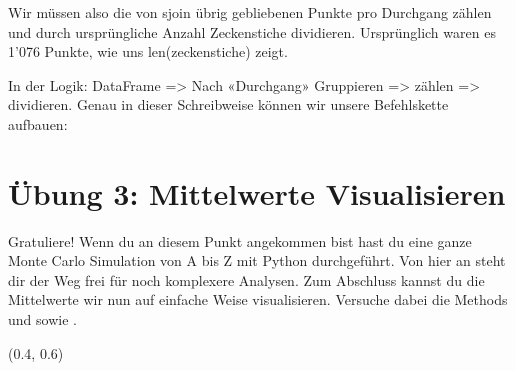 \documentclass[letterpaper,10pt,english]{sphinxmanual}
\begin{document}
Wir müssen also die von sjoin übrig gebliebenen Punkte pro Durchgang zählen und durch ursprüngliche Anzahl Zeckenstiche dividieren.  Ursprünglich waren es 1’076 Punkte, wie uns len(zeckenstiche) zeigt.

In der Logik: DataFrame =\textgreater{} Nach «Durchgang» Gruppieren =\textgreater{} zählen =\textgreater{} dividieren. Genau in dieser Schreibweise können wir unsere Befehlskette aufbauen:

\begin{sphinxVerbatim}[commandchars=\\\{\}]
  
\end{sphinxVerbatim}


\section{Übung 3: Mittelwerte Visualisieren}
\label{\detokenize{03_04_Waldanteil_Berechnen:ubung-3-mittelwerte-visualisieren}}
Gratuliere! Wenn du an diesem Punkt angekommen bist hast du eine ganze Monte Carlo Simulation von A bis Z mit Python durchgeführt. Von hier an steht dir der Weg frei für noch komplexere Analysen. Zum Abschluss kannst du die Mittelwerte wir nun auf einfache Weise visualisieren. Versuche dabei die Methods  und  sowie .

\begin{sphinxVerbatim}[commandchars=\\\{\}]
\end{sphinxVerbatim}

\begin{sphinxVerbatim}[commandchars=\\\{\}]
(0.4, 0.6)
\end{sphinxVerbatim}

\begin{sphinxVerbatim}[commandchars=\\\{\}]
\end{sphinxVerbatim}
\end{document}
